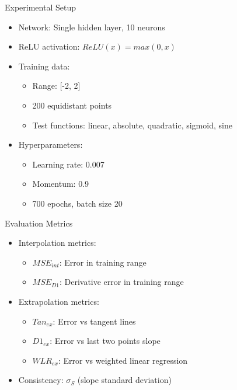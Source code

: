\documentclass{beamer}
\begin{document}
\begin{frame}{Experimental Setup}
    \begin{itemize}
        \item Network: Single hidden layer, 10 neurons
        \item ReLU activation: $ReLU(x) = max(0,x)$

        \item Training data:
        \begin{itemize}
            \item Range: [-2, 2]
            \item 200 equidistant points
            \item Test functions: linear, absolute, quadratic, sigmoid, sine
        \end{itemize}
        \item Hyperparameters:
        \begin{itemize}
            \item Learning rate: 0.007
            \item Momentum: 0.9
            \item 700 epochs, batch size 20
        \end{itemize}
    \end{itemize}
\end{frame}


\begin{frame}{Evaluation Metrics}
    \begin{itemize}
        \item Interpolation metrics:
        \begin{itemize}
            \item $MSE_{int}$: Error in training range
            \item $MSE_{D1}$: Derivative error in training range
        \end{itemize}
        \item Extrapolation metrics:
        \begin{itemize}
            \item $Tan_{ex}$: Error vs tangent lines
            \item $D1_{ex}$: Error vs last two points slope
            \item $WLR_{ex}$: Error vs weighted linear regression
            
        \end{itemize}
        \item Consistency: $\sigma_S$ (slope standard deviation)
    \end{itemize}
\end{frame}
\end{document}
